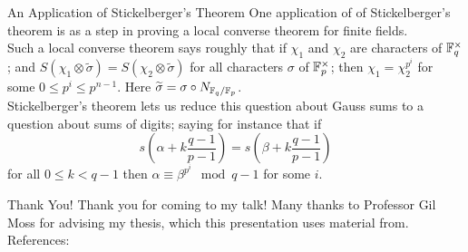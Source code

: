 \documentclass[presentation]{beamer}
\begin{document}
\begin{frame}{An Application of Stickelberger's Theorem}
One application of of Stickelberger's theorem is as a step in proving a local converse theorem for finite fields.\\
\pause
\vspace{0.5cm}
Such a local converse theorem says roughly that if $\chi_1$ and $\chi_2$ are characters of $\mathbb{F}_q^\times$; and $S(\chi_1 \otimes \widetilde{\sigma}) = S(\chi_2 \otimes \widetilde{\sigma})$ for all characters $\sigma$ of $\mathbb{F}_p^\times$; then $\chi_1 = \chi_2^{p^i}$ for some $0 \leq p^i \leq p^{n-1}$. Here $\widetilde{\sigma} = \sigma \circ N_{\mathbb{F}_q / \mathbb{F}_p}$.
\\
\pause
\vspace{0.5cm}
Stickelberger's theorem lets us reduce this question about Gauss sums to a question about sums of digits; saying for instance that if \[s\left(\alpha + k\frac{q-1}{p-1}\right) = s\left(\beta + k \frac{q-1}{p-1}\right)\] for all $0 \leq k < q-1$ then $\alpha \equiv \beta^{p^i} \mod q-1$ for some $i$.
\end{frame}



\begin{frame}{Thank You!}
Thank you for coming to my talk! Many thanks to Professor Gil Moss for advising my thesis, which this presentation uses material from.\\
\medskip
References:
\medskip
    

\end{frame}
\end{document}
